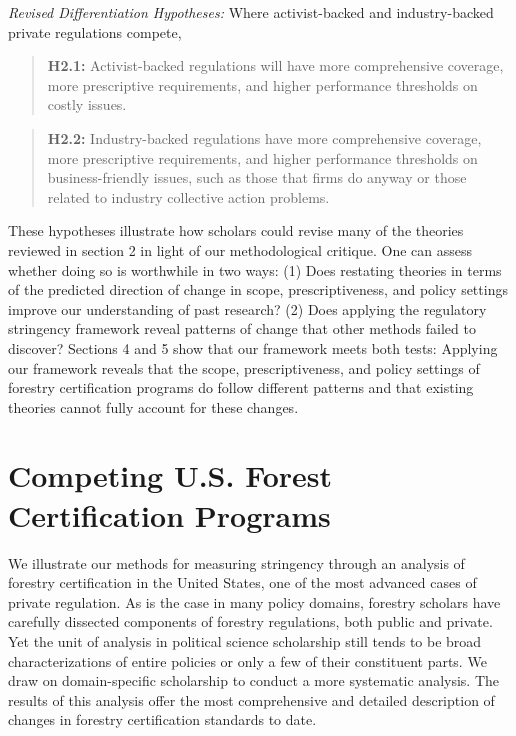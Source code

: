 \documentclass[
      12pt,
            Review ]{article}
\begin{document}
\emph{Revised Differentiation Hypotheses:} Where activist-backed and industry-backed private regulations compete,

\begin{quote}
\textbf{H2.1:} Activist-backed regulations will have more comprehensive coverage, more prescriptive requirements, and higher performance thresholds on costly issues.
\end{quote}

\begin{quote}
\textbf{H2.2:} Industry-backed regulations have more comprehensive coverage, more prescriptive requirements, and higher performance thresholds on business-friendly issues, such as those that firms do anyway or those related to industry collective action problems.
\end{quote}

These hypotheses illustrate how scholars could revise many of the theories reviewed in section 2 in light of our methodological critique. One can assess whether doing so is worthwhile in two ways: (1) Does restating theories in terms of the predicted direction of change in scope, prescriptiveness, and policy settings improve our understanding of past research? (2) Does applying the regulatory stringency framework reveal patterns of change that other methods failed to discover? Sections 4 and 5 show that our framework meets both tests: Applying our framework reveals that the scope, prescriptiveness, and policy settings of forestry certification programs do follow different patterns and that existing theories cannot fully account for these changes.

\hypertarget{competing-u.s.-forest-certification-programs}{%
\section{Competing U.S. Forest Certification Programs}\label{competing-u.s.-forest-certification-programs}}

We illustrate our methods for measuring stringency through an analysis of forestry certification in the United States, one of the most advanced cases of private regulation. As is the case in many policy domains, forestry scholars have carefully dissected components of forestry regulations, both public and private. Yet the unit of analysis in political science scholarship still tends to be broad characterizations of entire policies or only a few of their constituent parts. We draw on domain-specific scholarship to conduct a more systematic analysis. The results of this analysis offer the most comprehensive and detailed description of changes in forestry certification standards to date.
\end{document}
